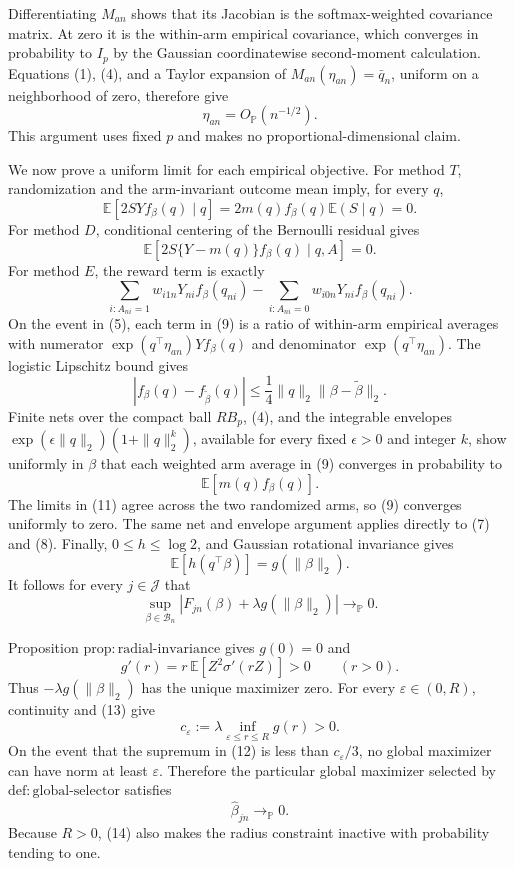 Differentiating \(M_{an}\) shows that its Jacobian is the softmax-weighted
covariance matrix.  At zero it is the within-arm empirical covariance, which
converges in probability to \(I_p\) by the Gaussian coordinatewise
second-moment calculation.  Equations (1), (4), and a Taylor expansion of
\(M_{an}(\eta_{an})=\bar q_n\), uniform on a neighborhood of zero, therefore
give
\[
 \eta_{an}=O_{\mathbb P}(n^{-1/2}).
 \tag{6}
\]
This argument uses fixed \(p\) and makes no proportional-dimensional claim.

We now prove a uniform limit for each empirical objective.  For method
\(T\), randomization and the arm-invariant outcome mean imply, for every
\(q\),
\[
 \mathbb E[2S Y f_\beta(q)\mid q]
 =2m(q)f_\beta(q)\mathbb E(S\mid q)=0.
 \tag{7}
\]
For method \(D\), conditional centering of the Bernoulli residual gives
\[
 \mathbb E[2S\{Y-m(q)\}f_\beta(q)\mid q,A]=0.
 \tag{8}
\]
For method \(E\), the reward term is exactly
\[
 \sum_{i:A_{ni}=1}w_{i1n}Y_{ni}f_\beta(q_{ni})
 -\sum_{i:A_{ni}=0}w_{i0n}Y_{ni}f_\beta(q_{ni}).
 \tag{9}
\]
On the event in (5), each term in (9) is a ratio of within-arm empirical
averages with numerator
\(\exp(q^\top\eta_{an})Yf_\beta(q)\) and denominator
\(\exp(q^\top\eta_{an})\).  The logistic Lipschitz bound gives
\[
 |f_\beta(q)-f_{\widetilde\beta}(q)|
 \le\frac14\|q\|_2\|\beta-\widetilde\beta\|_2.
 \tag{10}
\]
Finite nets over the compact ball \(RB_p\), (4), and the integrable envelopes
\(\exp(\epsilon\|q\|_2)(1+\|q\|_2^k)\), available for every fixed
\(\epsilon>0\) and integer \(k\), show uniformly in \(\beta\) that each
weighted arm average in (9) converges in probability to
\[
 \mathbb E[m(q)f_\beta(q)].
 \tag{11}
\]
The limits in (11) agree across the two randomized arms, so (9) converges
uniformly to zero.  The same net and envelope argument applies directly to
(7) and (8).  Finally, \(0\le h\le\log2\), and Gaussian rotational
invariance gives
\[
 \mathbb E[h(q^\top\beta)]=g(\|\beta\|_2).
\]
It follows for every \(j\in\mathcal J\) that
\[
 \sup_{\beta\in\mathcal B_n}
 \left|F_{jn}(\beta)+\lambda g(\|\beta\|_2)\right|
 \longrightarrow_{\mathbb P}0.
 \tag{12}
\]

Proposition \(\mathrm{prop{:}radial\mbox{-}invariance}\) gives \(g(0)=0\)
and
\[
 g'(r)=r\,\mathbb E[Z^2\sigma'(rZ)]>0
 \qquad(r>0).
 \tag{13}
\]
Thus \(-\lambda g(\|\beta\|_2)\) has the unique maximizer zero.  For every
\(\varepsilon\in(0,R)\), continuity and (13) give
\[
 c_\varepsilon
 :=\lambda\inf_{\varepsilon\le r\le R}g(r)>0.
\]
On the event that the supremum in (12) is less than
\(c_\varepsilon/3\), no global maximizer can have norm at least
\(\varepsilon\).  Therefore the particular global maximizer selected by
\(\mathrm{def{:}global\mbox{-}selector}\) satisfies
\[
 \widehat\beta_{jn}\longrightarrow_{\mathbb P}0.
 \tag{14}
\]
Because \(R>0\), (14) also makes the radius constraint inactive with
probability tending to one.

